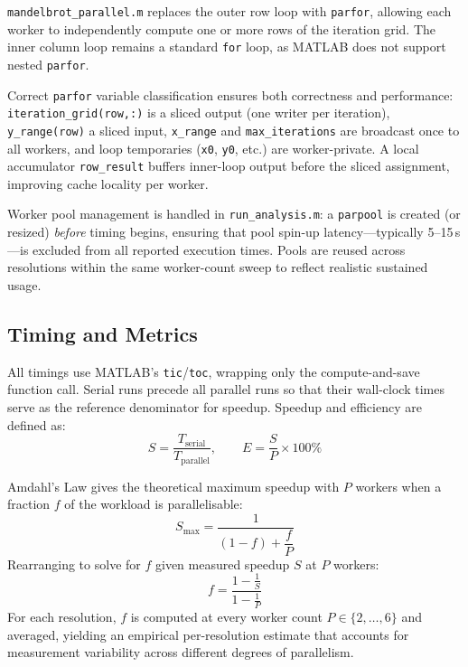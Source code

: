 \documentclass[conference]{IEEEtran}
\begin{document}
\texttt{mandelbrot\_parallel.m} replaces the outer row loop with
\texttt{parfor}, allowing each worker to independently compute one or more
rows of the iteration grid.  The inner column loop remains a standard
\texttt{for} loop, as MATLAB does not support nested \texttt{parfor}.

Correct \texttt{parfor} variable classification ensures both correctness and
performance: \texttt{iteration\_grid(row,:)} is a sliced output (one writer
per iteration), \texttt{y\_range(row)} a sliced input, \texttt{x\_range} and
\texttt{max\_iterations} are broadcast once to all workers, and loop
temporaries (\texttt{x0}, \texttt{y0}, etc.) are worker-private.  A local
accumulator \texttt{row\_result} buffers inner-loop output before the sliced
assignment, improving cache locality per worker.

Worker pool management is handled in \texttt{run\_analysis.m}: a
\texttt{parpool} is created (or resized) \emph{before} timing begins,
ensuring that pool spin-up latency---typically 5--15\,s---is excluded from
all reported execution times.  Pools are reused across resolutions within
the same worker-count sweep to reflect realistic sustained usage.

\subsection{Timing and Metrics}

All timings use MATLAB's \texttt{tic}/\texttt{toc}, wrapping only the
compute-and-save function call.  Serial runs precede all parallel runs so
that their wall-clock times serve as the reference denominator for speedup.
Speedup and efficiency are defined as:
\begin{equation}
  S = \frac{T_{\text{serial}}}{T_{\text{parallel}}}, \qquad
  E = \frac{S}{P} \times 100\%
\end{equation}

Amdahl's Law gives the theoretical maximum speedup with $P$ workers when a
fraction $f$ of the workload is parallelisable:
\begin{equation}
  S_{\max} = \frac{1}{(1 - f) + \dfrac{f}{P}}
  \label{eq:amdahl_s}
\end{equation}
Rearranging to solve for $f$ given measured speedup $S$ at $P$ workers:
\begin{equation}
  f = \frac{1 - \tfrac{1}{S}}{1 - \tfrac{1}{P}}
  \label{eq:amdahl_f}
\end{equation}
For each resolution, $f$ is computed at every worker count
$P \in \{2,\ldots,6\}$ and averaged, yielding an empirical per-resolution
estimate that accounts for measurement variability across different degrees
of parallelism.
\end{document}
